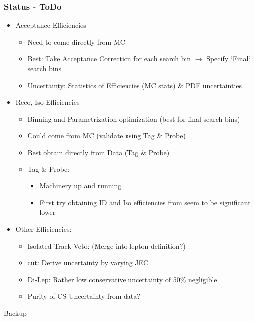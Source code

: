 \documentclass{beamer}
\begin{document}
\begin{frame}
 \frametitle{Status - ToDo}
 \begin{itemize}
  \item Acceptance Efficiencies
  \begin{itemize}
   \item Need to come directly from MC
   \item Best: Take Acceptance Correction for each search bin $\rightarrow$ Specify `Final` search bins
   \item Uncertainty: Statistics of Efficiencies (MC stats) \& PDF uncertainties
  \end{itemize}
  \item Reco, Iso Efficiencies
  \begin{itemize}
   \item Binning and Parametrization optimization (best for final search bins)
   \item Could come from MC (validate using Tag \& Probe)
   \item Best obtain directly from Data (Tag \& Probe)

  \item Tag \& Probe:
 \begin{itemize}
  \item Machinery up and running
  \item First try obtaining ID and Iso efficiencies from \Zll seem to be significant lower
 \end{itemize}
 \end{itemize}
 \item Other Efficiencies:
 \begin{itemize}
  \item Isolated Track Veto: (Merge into lepton definition?)
  \item \mt cut: Derive uncertainty by varying JEC
  \item Di-Lep: Rather low conservative uncertainty of 50\% negligible
  \item Purity of CS Uncertainty from data?
 \end{itemize}

 \end{itemize}

\end{frame}
\begin{frame}
 \begin{block}{}
 \centering
 \Large Backup
 \end{block}
\end{frame}
\end{document}

